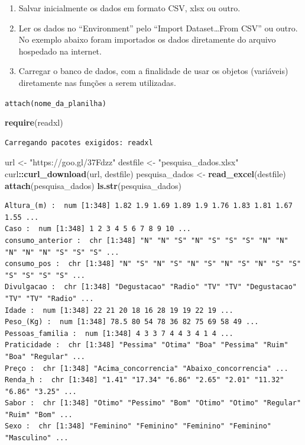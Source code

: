 \documentclass[12pt,brazil,oneside]{book}
\newenvironment{Shaded}{\begin{snugshade}}{\end{snugshade}}
\newcommand{\KeywordTok}[1]{\textcolor[rgb]{0.13,0.29,0.53}{\textbf{#1}}}
\newcommand{\NormalTok}[1]{#1}
\newcommand{\OperatorTok}[1]{\textcolor[rgb]{0.81,0.36,0.00}{\textbf{#1}}}
\newcommand{\StringTok}[1]{\textcolor[rgb]{0.31,0.60,0.02}{#1}}
\begin{document}
\begin{enumerate}
\def\labelenumi{\arabic{enumi}.}
\item
  Salvar inicialmente os dados em formato CSV, xlsx ou outro.
\item
  Ler os dados no ``Environment'' pelo ``Import Dataset\ldots{}From
  CSV'' ou outro. No exemplo abaixo foram importados os dados
  diretamente do arquivo hospedado na internet.
\item
  Carregar o banco de dados, com a finalidade de usar os objetos
  (variáveis) diretamente nas funções a serem utilizadas.
\end{enumerate}

\texttt{attach(nome\_da\_planilha)}

\begin{Shaded}
\begin{Highlighting}[]
\KeywordTok{require}\NormalTok{(readxl)}
\end{Highlighting}
\end{Shaded}

\begin{verbatim}
Carregando pacotes exigidos: readxl
\end{verbatim}

\begin{Shaded}
\begin{Highlighting}[]
\NormalTok{url <-}\StringTok{ "https://goo.gl/37Fdzz"}
\NormalTok{destfile <-}\StringTok{ "pesquisa_dados.xlsx"}
\NormalTok{curl}\OperatorTok{::}\KeywordTok{curl_download}\NormalTok{(url, destfile)}
\NormalTok{pesquisa_dados <-}\StringTok{ }\KeywordTok{read_excel}\NormalTok{(destfile)}
\KeywordTok{attach}\NormalTok{(pesquisa_dados)}
\KeywordTok{ls.str}\NormalTok{(pesquisa_dados)}
\end{Highlighting}
\end{Shaded}

\begin{verbatim}
Altura_(m) :  num [1:348] 1.82 1.9 1.69 1.89 1.9 1.76 1.83 1.81 1.67 1.55 ...
Caso :  num [1:348] 1 2 3 4 5 6 7 8 9 10 ...
consumo_anterior :  chr [1:348] "N" "N" "S" "N" "S" "S" "S" "N" "N" "N" "N" "N" "S" "S" "S" ...
consumo_pos :  chr [1:348] "N" "S" "N" "S" "N" "S" "N" "S" "N" "S" "S" "S" "S" "S" "S" ...
Divulgacao :  chr [1:348] "Degustacao" "Radio" "TV" "TV" "Degustacao" "TV" "TV" "Radio" ...
Idade :  num [1:348] 22 21 20 18 16 28 19 19 22 19 ...
Peso_(Kg) :  num [1:348] 78.5 80 54 78 36 82 75 69 58 49 ...
Pessoas_familia :  num [1:348] 4 3 3 7 4 4 3 4 1 4 ...
Praticidade :  chr [1:348] "Pessima" "Otima" "Boa" "Pessima" "Ruim" "Boa" "Regular" ...
Preço :  chr [1:348] "Acima_concorrencia" "Abaixo_concorrencia" ...
Renda_h :  chr [1:348] "1.41" "17.34" "6.86" "2.65" "2.01" "11.32" "6.86" "3.25" ...
Sabor :  chr [1:348] "Otimo" "Pessimo" "Bom" "Otimo" "Otimo" "Regular" "Ruim" "Bom" ...
Sexo :  chr [1:348] "Feminino" "Feminino" "Feminino" "Feminino" "Masculino" ...
\end{verbatim}
\end{document}
